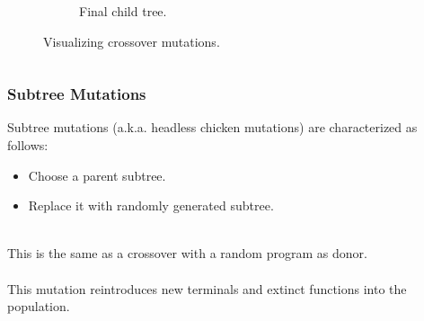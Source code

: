 \documentclass{beamer}
\begin{document}
\begin{frame}
\begin{columns}
\begin{column}{0.6\textwidth}
\begin{figure}
\begin{subfigure}{0.6\textwidth}
          \caption{Final child tree.}
          \label{fig:crossover_mutb}
        \end{subfigure}
        \caption{Visualizing crossover mutations.}
        \label{fig:crossover}
      \end{figure}
    \end{column}
  \end{columns}
\end{frame}

\begin{frame}
  \frametitle{Subtree Mutations}
  Subtree mutations (a.k.a. headless chicken mutations) are characterized as follows:
  \begin{itemize}
    \item Choose a parent subtree.
    \item Replace it with randomly generated subtree.
  \end{itemize}
  ~\\
  This is the same as a crossover with a random program as donor.\\~\\
  This mutation reintroduces new terminals and extinct functions into the population.
\end{frame}
\end{document}
